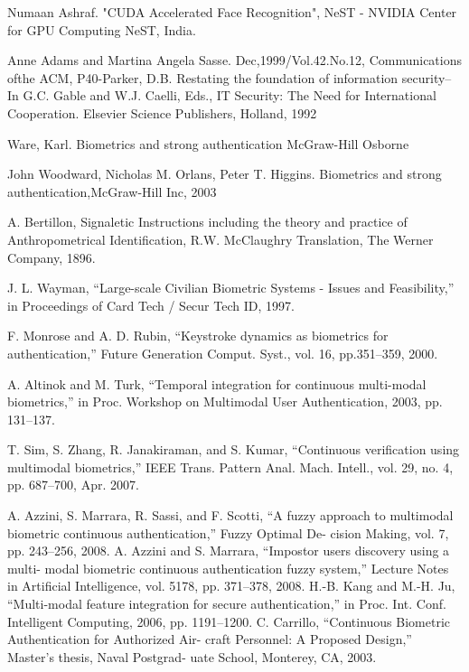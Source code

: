\begin{thebibliography}{77}
 Numaan Ashraf. 
"CUDA Accelerated Face Recognition",
NeST - NVIDIA Center for GPU Computing NeST, India.

Anne Adams and Martina Angela Sasse.
Dec,1999/Vol.42.No.12, Communications ofthe ACM,
P40-Parker, D.B. Restating the foundation of information security-- In G.C.
Gable and W.J. Caelli, Eds., IT Security: The Need for International Cooperation.
Elsevier Science Publishers, Holland, 1992

 Ware, Karl.
Biometrics and strong authentication McGraw-Hill Osborne

John Woodward, Nicholas M. Orlans, Peter T. Higgins.
Biometrics and strong authentication,McGraw-Hill Inc, 2003

A. Bertillon,
Signaletic Instructions including the theory and practice of Anthropometrical Identification, R.W.
McClaughry Translation, The Werner Company, 1896.

J. L. Wayman,
“Large-scale Civilian Biometric Systems - Issues and Feasibility,” in Proceedings of Card Tech /
Secur Tech ID, 1997.

F. Monrose and A. D. Rubin, 
“Keystroke dynamics as biometrics for authentication,” 
Future Generation Comput. Syst., vol. 16, pp.351–359, 2000.

A. Altinok and M. Turk, 
“Temporal integration for continuous multi-modal biometrics,”
in Proc. Workshop on Multimodal User Authentication, 2003, pp. 131–137.

T. Sim, S. Zhang, R. Janakiraman, and S. Kumar, 
“Continuous verification using multimodal biometrics,” 
IEEE Trans. Pattern Anal. Mach. Intell., vol. 29, no. 4, pp. 687–700, Apr. 2007.

A. Azzini, S. Marrara, R. Sassi, and F. Scotti, “A fuzzy approach to
multimodal biometric continuous authentication,” Fuzzy Optimal De-
cision Making, vol. 7, pp. 243–256, 2008.
A. Azzini and S. Marrara, “Impostor users discovery using a multi-
modal biometric continuous authentication fuzzy system,” Lecture
Notes in Artificial Intelligence, vol. 5178, pp. 371–378, 2008.
H.-B. Kang and M.-H. Ju, “Multi-modal feature integration for secure
authentication,” in Proc. Int. Conf. Intelligent Computing, 2006, pp.
1191–1200.
C. Carrillo, “Continuous Biometric Authentication for Authorized Air-
craft Personnel: A Proposed Design,” Master’s thesis, Naval Postgrad-
uate School, Monterey, CA, 2003.

\end{thebibliography}
